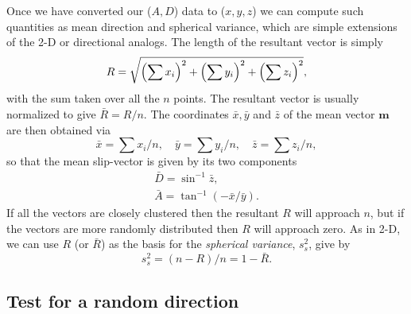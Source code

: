 Once we have converted our ($A, D$) data to ($x,y,z$) we can compute such quantities as mean 
direction and spherical variance, which are simple extensions of the 2-D or directional analogs.  
The length of the resultant vector is simply
\begin{equation}
	\index{Vector!mean resultant}
	\index{Mean resultant vector}
R = \sqrt{\left( \displaystyle \sum x_i \right)^2 + \left( \displaystyle \sum y_i \right)^2 + 
\left( \sum z_i \right)^2},
\label{eq:Rlength}
\end{equation}
with the sum taken over all the $n$ points. The resultant vector
is usually normalized to give $\bar{R} = R / n$.  The coordinates $\bar{x}, \bar{y}$ and $\bar{z}$
of the mean vector $\mathbf{m}$ are then obtained via
\begin{equation}
\bar{x} = \displaystyle \sum x_i/n,\quad
\bar{y} = \displaystyle \sum y_i/n,\quad
\bar{z} = \displaystyle \sum z_i/n,
\end{equation}
so that the mean slip-vector is given by its two components
\begin{equation} \begin{array}{ccc}
\bar{D} = \sin^{-1} \bar{z},\\
\bar{A} = \tan^{-1} (- \bar{x}/ \bar{y}).
\end{array}
\end{equation}
If all the vectors are closely clustered then the resultant $R$ will approach $n$, but if the vectors
are more randomly distributed then $R$ will approach zero.  As in 2-D, we can use $R$ (or $\bar{R}$) as the basis
for the \emph{spherical variance}, $s^2_s$, give by
\begin{equation}
s^2_s = (n-R) / n = 1 - \bar{R}.
\end{equation}
\subsection{Test for a random direction}

